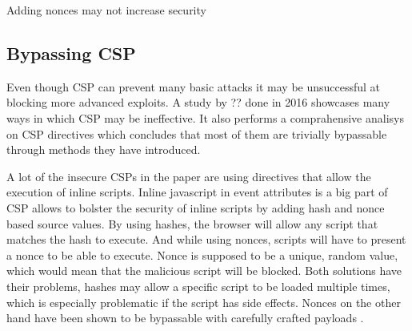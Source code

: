 \documentclass[11]{article}   %
\begin{document}
%
%
%


Adding nonces may not increase security

\subsection{Bypassing CSP}
Even though CSP can prevent many basic attacks it may be unsuccessful at blocking more advanced exploits.
A study by ?? \cite{??} done in 2016 showcases many ways in which CSP may be ineffective. 
It also performs a comprahensive analisys on CSP directives which concludes that most of them are trivially bypassable through methods they have introduced.

A lot of the insecure CSPs in the paper are using directives that allow the execution of inline scripts.
Inline javascript in event attributes is a big part of 
CSP allows to bolster the security of inline scripts by adding hash and nonce based source values.
By using hashes, the browser will allow any script that matches the hash to execute.
And while using nonces, scripts will have to present a nonce to be able to execute. 
Nonce is supposed to be a unique, random value, which would mean that the malicious script will be blocked.
Both solutions have their problems, hashes may allow a specific script to be loaded multiple times, which is especially problematic if the script has side effects.
Nonces on the other hand have been shown to be bypassable with carefully crafted payloads \cite{???}.
\end{document}
